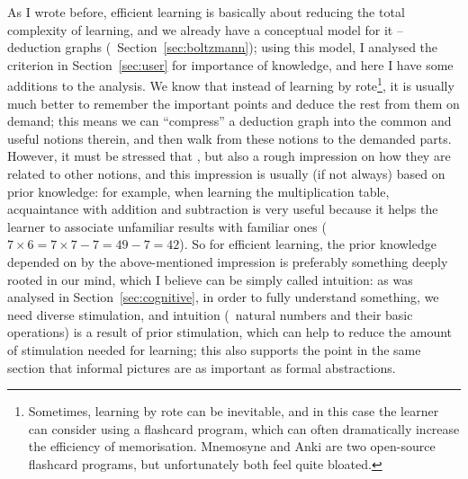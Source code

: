 As I wrote before, efficient learning is basically about reducing the total
complexity of learning, and we already have a conceptual model for it --
deduction graphs (\cf~Section~\ref{sec:boltzmann}); using this model, I
analysed the criterion in Section~\ref{sec:user} for importance of knowledge,
and here I have some additions to the analysis.  We know that instead of
learning by rote\footnote{Sometimes, learning by rote can be inevitable, and in
this case the learner can consider using a flashcard program, which can often
dramatically increase the efficiency of memorisation.  Mnemosyne and Anki are
two open-source flashcard programs, but unfortunately both feel quite bloated.},
it is usually much better to remember the important points and deduce the rest
from them on demand; this means we can ``compress'' a deduction graph into the
common and useful notions therein, and then walk from these notions to the
demanded parts.  However, it must be stressed that , but also a rough impression on how they are
related to other notions, and this impression is usually (if not always) based
on prior knowledge: for example, when learning the multiplication table,
acquaintance with addition and subtraction is very useful because it helps the
learner to associate unfamiliar results with familiar ones (\eg~$7 \times 6 =
7 \times 7 - 7 = 49 - 7 = 42$).  So for efficient learning, the prior knowledge
depended on by the above-mentioned impression is preferably something deeply
rooted in our mind, which I believe can be simply called intuition: as was
analysed in Section~\ref{sec:cognitive}, in order to fully understand something,
we need diverse stimulation, and intuition (\eg~natural numbers and their basic
operations) is a result of prior stimulation, which can help to reduce the
amount of stimulation needed for learning; this also supports the point in the
same section that informal pictures are as important as formal abstractions.


